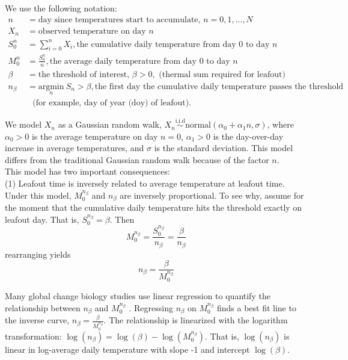 \documentclass[11pt]{article}
\begin{document}
We use the following notation:
\begin{align*}
n & = \text{day since temperatures start to accumulate, }  n = 0, 1, ..., N\\
X_n & = \text{observed temperature on day $n$} \\
S_0^n & = \sum_{i = 0}^{n}X_i, \text{the cumulative daily temperature from day $0$ to day $n$}\\ 
M_0^n & = \frac{S_0^n}{n}, \text{the average daily temperature from day $0$ to day $n$}\\ 
\beta & = \text{the threshold of interest, } \beta > 0, \text{ (thermal sum required for leafout)}\\ %
n_{\beta} &  = \underset{n}{\text{argmin}} \ S_n > \beta, \text{the first day the cumulative daily temperature passes the threshold} \\
& \ \ \ \text{(for example, day of year (doy) of leafout).}
\end{align*} 

We model $X_n$ as a Gaussian random walk, $X_n \overset{\text{i.i.d}}{\sim} \text{normal}\left ( \alpha_0 + \alpha_1 n , \sigma \right )$, where $\alpha_0 > 0$ is the average temperature on day $n = 0$, $\alpha_1 > 0$ is the day-over-day increase in average temperatures, and $\sigma$ is the standard deviation. This model differs from the traditional Gaussian random walk because of the factor $n$.\\

This model has two important consequences: \\

(1) Leafout time is inversely related to average temperature at leafout time.\\

Under this model, $M_0^{n_{\beta}}$ and $n_{\beta}$ are inversely proportional. To see why, assume for the moment that the cumulative daily temperature hits the threshold exactly on leafout day. That is, $S_0^{n_\beta} = \beta$.
Then $$M_0^{n_{\beta}} = \frac{S_0^{n_{\beta}}}{{n_{\beta}}} = \frac{\beta}{{n_{\beta}}}$$ rearranging yields $${n_{\beta}} = \frac{\beta}{M_0^{n_{\beta}}}$$

Many global change biology studies use linear regression to quantify the relationship between $n_{\beta}$ and $M_0^{n_{\beta}}$ \citep[or similar metrics, see][for examples]{Wolkovich:2012n,piao2017,keenan2019}. Regressing $n_{\beta}$ on $M_0^{n_{\beta}}$ finds a best fit line to the inverse curve, ${n_{\beta}} = \frac{\beta}{M_0^{n_{\beta}}}$. The relationship is linearized with the logarithm transformation: $\log ({n_{\beta}}) = \log(\beta) - \log (M_0^{n_{\beta}})$. That is, $\log(n_{\beta})$ is linear in log-average daily temperature with slope -1 and intercept $\log(\beta)$. \\ %
\end{document}

